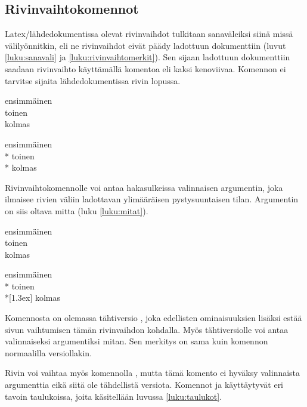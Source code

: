 \subsection{Rivinvaihtokomennot}
\label{luku:rivinvaihtokomennot}

Latex\-/lähdedokumentissa olevat rivinvaihdot tulkitaan sanaväleiksi
siinä missä välilyönnitkin, eli ne rivinvaihdot eivät päädy ladottuun
dokumenttiin (luvut \ref{luku:sanavali} ja
\ref{luku:rivinvaihtomerkit}). Sen sijaan ladottuun dokumenttiin saadaan
rivinvaihto käyttämällä komentoa \komentom{\keno} eli kaksi kenoviivaa.
Komennon ei tarvitse sijaita lähdedokumentissa rivin lopussa.

\komentoi{\keno}
\begin{koodilohkosis}
  ensimmäinen \\ toinen \\
  kolmas
\end{koodilohkosis}

\begin{tulossis}
  ensimmäinen \\* toinen \\* kolmas
\end{tulossis}

Rivinvaihtokomennolle voi antaa hakasulkeissa valinnaisen argumentin,
joka ilmaisee rivien väliin ladottavan ylimääräisen pystysuuntaisen
tilan. Argumentin on siis oltava mitta (luku \ref{luku:mitat}).

\komentoi{\keno}
\begin{koodilohkosis}
  ensimmäinen \\ toinen \\[1.3ex] kolmas
\end{koodilohkosis}

\begin{tulossis}
  ensimmäinen \\* toinen \\*[1.3ex] kolmas
\end{tulossis}

Komennosta on olemassa tähtiversio \komentom{\keno *}, joka edellisten
ominaisuuksien lisäksi estää sivun vaihtumisen tämän rivinvaihdon
kohdalla. Myös tähtiversiolle voi antaa valinnaiseksi argumentiksi
mitan. Sen merkitys on sama kuin komennon normaalilla versiollakin.

Rivin voi vaihtaa myös komennolla , mutta tämä
komento ei hyväksy valinnaista argumenttia eikä siitä ole tähdellistä
versiota. Komennot  ja \komento{\keno} käyttäytyvät eri
tavoin taulukoissa, joita käsitellään luvussa \ref{luku:taulukot}.


